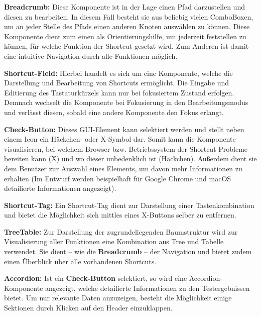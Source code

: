  \textbf{Breadcrumb:} Diese Komponente ist in der Lage einen Pfad darzustellen und diesen zu bearbeiten. In diesem Fall besteht sie aus beliebig vielen ComboBoxen, um an jeder Stelle des Pfads einen anderen Knoten auswählen zu können. Diese Komponente dient zum einen als Orientierungshilfe, um jederzeit feststellen zu können, für welche Funktion der Shortcut gesetzt wird. Zum Anderen ist damit eine intuitive Navigation durch alle Funktionen möglich.

 \textbf{Shortcut-Field:} Hierbei handelt es sich um eine Komponente, welche die Darstellung und Bearbeitung von Shortcuts ermöglicht. Die Eingabe und Editierung des Tastaturkürzels kann nur bei fokusiertem Zustand erfolgen. Demnach wechselt die Komponente bei Fokusierung in den Bearbeitungsmodus und verlässt diesen, sobald eine andere Komponente den Fokus erlangt.

 \textbf{Check-Button:} Dieses GUI-Element kann selektiert werden und stellt neben einem Icon ein Häckchen- oder X-Symbol dar. Somit kann die Komponente visualisieren, bei welchem Browser bzw. Betriebssystem der Shortcut Probleme bereiten kann (X) und wo dieser unbedenklich ist (Häckchen). Außerdem dient sie dem Benutzer zur Auswahl eines Elements, um davon mehr Informationen zu erhalten (Im Entwurf werden beispielhaft für Google Chrome und macOS detailierte Informationen angezeigt).

 \textbf{Shortcut-Tag:} Ein Shortcut-Tag dient zur Darstellung einer Tastenkombination und bietet die Möglichkeit sich mittles eines X-Buttons selber zu entfernen.

 \textbf{TreeTable:} Zur Darstellung der zugrundeliegenden Baumstruktur wird zur Visualisierung aller Funktionen eine Kombination aus Tree und Tabelle verwendet. Sie dient -- wie die \textbf{Breadcrumb} -- der Navigation und bietet zudem einen Überblick über alle vorhandenen Shortcuts.

 \textbf{Accordion:} Ist ein \textbf{Check-Button} selektiert, so wird eine Accordion-Komponente angezeigt, welche detailierte Informationen zu den Testergebnissen bietet. Um nur relevante Daten anzuzeigen, besteht die Möglichkeit einige Sektionen durch Klicken auf den Header einzuklappen.

